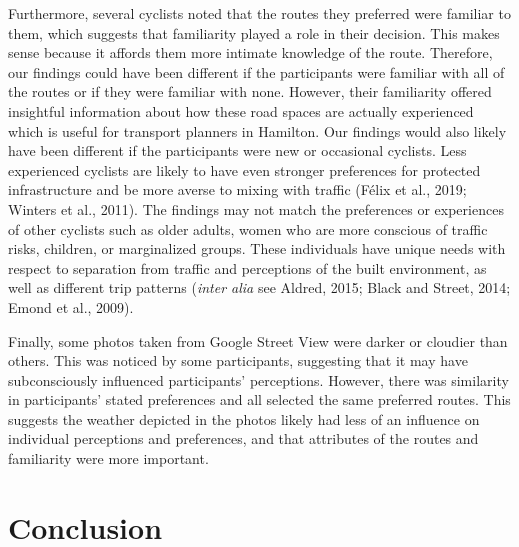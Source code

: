 \documentclass[]{elsarticle} %
\begin{document}
Furthermore, several cyclists noted that the routes they preferred were
familiar to them, which suggests that familiarity played a role in their
decision. This makes sense because it affords them more intimate
knowledge of the route. Therefore, our findings could have been
different if the participants were familiar with all of the routes or if
they were familiar with none. However, their familiarity offered
insightful information about how these road spaces are actually
experienced which is useful for transport planners in Hamilton. Our
findings would also likely have been different if the participants were
new or occasional cyclists. Less experienced cyclists are likely to have
even stronger preferences for protected infrastructure and be more
averse to mixing with traffic (Félix et al., 2019; Winters et al.,
2011). The findings may not match the preferences or experiences of
other cyclists such as older adults, women who are more conscious of
traffic risks, children, or marginalized groups. These individuals have
unique needs with respect to separation from traffic and perceptions of
the built environment, as well as different trip patterns (\emph{inter
alia} see Aldred, 2015; Black and Street, 2014; Emond et al., 2009).

Finally, some photos taken from Google Street View were darker or
cloudier than others. This was noticed by some participants, suggesting
that it may have subconsciously influenced participants' perceptions.
However, there was similarity in participants' stated preferences and
all selected the same preferred routes. This suggests the weather
depicted in the photos likely had less of an influence on individual
perceptions and preferences, and that attributes of the routes and
familiarity were more important.

\hypertarget{sec:conclusion}{%
\section{Conclusion}\label{sec:conclusion}}
\end{document}
